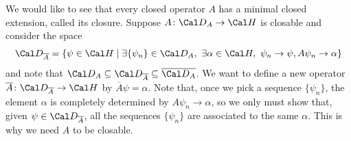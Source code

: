 We would like to see that every closed operator \(A\) has a minimal
closed extension, called its closure.
Suppose \(A\colon\Cal D_A\to\Cal H\) is closable and consider the space
\begin{equation}
  \Cal D_{\overline A}
  = \{\psi\in\Cal H \mid
    \exists \{\psi_n\}\in\Cal D_A, \
    \exists \alpha\in\Cal H, \
    \psi_n\to \psi, A\psi_n\to \alpha\}
\end{equation}
and note that \(\Cal D_A\subseteq \Cal D_{\overline A}\subseteq
\overline{\Cal D_A}\).
We want to define a new operator \(\overline A\colon \Cal D_{\overline
A}\to\Cal H\) by \(\overline A\psi = \alpha\).
Note that, once we pick a sequence \(\{\psi_n\}\), the element
\(\alpha\) is completely determined by \(A\psi_n\to\alpha\),
so we only must show that, given \(\psi\in\Cal D_{\overline A}\), all
the sequences \(\{\psi_n\}\) are associated to the same \(\alpha\).
This is why we need \(A\) to be closable.

